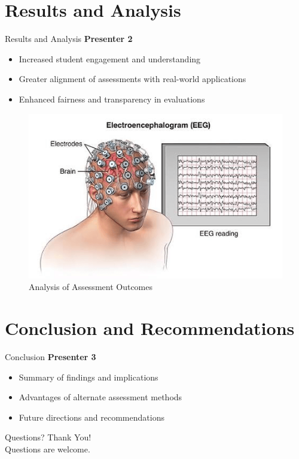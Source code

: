 \documentclass{beamer}
\begin{document}
\section{Results and Analysis}
\begin{frame}{Results and Analysis}
    \textbf{Presenter 2}
    \begin{itemize}
        \item Increased student engagement and understanding
        \item Greater alignment of assessments with real-world applications
        \item Enhanced fairness and transparency in evaluations
    \end{itemize}
    \begin{figure}
        \includegraphics[width=0.8\linewidth]{images/eeg.png}
        \caption{Analysis of Assessment Outcomes}
    \end{figure}
\end{frame}

\section{Conclusion and Recommendations}
\begin{frame}{Conclusion}
    \textbf{Presenter 3}
    \begin{itemize}
        \item Summary of findings and implications
        \item Advantages of alternate assessment methods
        \item Future directions and recommendations
    \end{itemize}
\end{frame}

\begin{frame}{Questions?}
    \centering
    \Large Thank You! \\
    \vspace{1cm}
    \normalsize
    Questions are welcome.
\end{frame}
\end{document}
